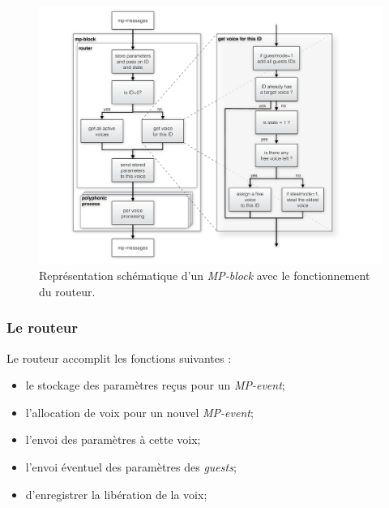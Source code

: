 \begin{figure}[!htbp]
	\captionsetup{format=plain}
	\includegraphics[width=\textwidth]{gfx/04_algorithms/MP-block-model.pdf}
	\caption[Représentation schématique d'un \textit{MP-block}]{Représentation schématique d'un \textit{MP-block} avec le fonctionnement du routeur.}
	\label{fig:algorithms:MP-block-model}
\end{figure}


\subsubsection{Le routeur}

\noindent Le routeur accomplit les fonctions suivantes :
\vspace{-1em}
\begin{itemize}[noitemsep]
	\item le stockage des paramètres reçus pour un \textit{MP-event};
	\item l'allocation de voix pour un nouvel \textit{MP-event};
	\item l'envoi des paramètres à cette voix;
	\item l'envoi éventuel des paramètres des \textit{guests};
	\item d'enregistrer la libération de la voix;
\end{itemize}

